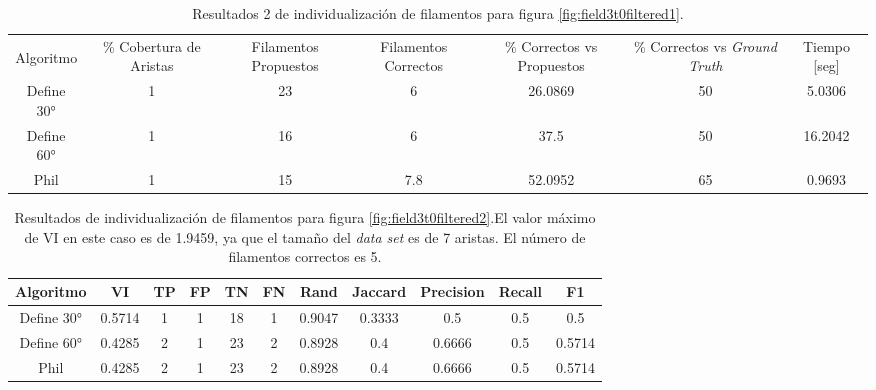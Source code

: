 \begin{table}[h]
    \centering
    \begin{tabular}{|c|c|c|c|c|c|c|}
    \hline
         & \multirow{4}{2cm}{\centering \% Cobertura de Aristas} & \multirow{4}{2cm}{Filamentos Propuestos} & \multirow{4}{2cm}{Filamentos Correctos} & \multirow{4}{2.5cm}{\% Correctos vs Propuestos} & \multirow{4}{2.5cm}{\centering \% Correctos vs {\it Ground Truth}} & \multirow{4}{1.2cm}{\centering Tiempo [seg]} \\
         &  &  &  & & &  \\
        Algoritmo &  &  &  & & &  \\
        &  &  &  & & &  \\ \hline
        Define 30° &  1 & 23 & 6 & 26.0869 & 50 & 5.0306 \\
        Define 60° &  1 & 16 & 6 & 37.5 & 50 & 16.2042\\ 
        Phil &  1 & 15 & 7.8 & 52.0952 & 65 & 0.9693 \\
        \hline
    \end{tabular}
    \caption{Resultados 2 de individualizaci\'on de filamentos para figura \ref{fig:field3t0filtered1}.}
    \label{tab:field3t0filtered1-2}
\end{table}



\begin{table}[h]
    \centering
    \begin{tabular}{|c|c|c|c|c|c|c|c|c|c|c|}
    \hline
        Algoritmo & VI & TP & FP &TN &FN & Rand	& Jaccard &	Precision &	Recall &	F1 \\ \hline
        Define 30° & 0.5714 & 1 & 1 & 18 & 1 & 0.9047 & 0.3333 & 0.5      & 0.5 & 0.5\\
        Define 60° & 0.4285 & 2 & 1 & 23 & 2 & 0.8928 & 0.4 & 0.6666 & 0.5 & 0.5714\\ 
        Phil & 0.4285  & 2 & 1 & 23 & 2 & 0.8928 & 0.4 & 0.6666 & 0.5 & 0.5714\\
        \hline
    \end{tabular}
    \caption{Resultados de individualizaci\'on de filamentos para figura \ref{fig:field3t0filtered2}.El valor m\'aximo de VI en este caso es de 1.9459, ya que el tama\~no del {\it data set} es de 7 aristas. El n\'umero de filamentos correctos es 5.}
    \label{tab:field3t0filtered2}
\end{table}

